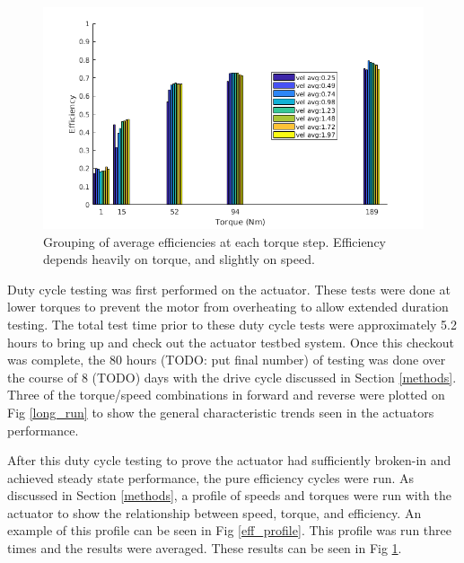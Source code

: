 
   \begin{figure}[t]
      \centering
      \includegraphics[width=\linewidth]{eff_test_bar_plot_v2}
      \caption{Grouping of average efficiencies at each torque step. Efficiency depends heavily on torque, and slightly on speed.}
      \label{eff_results}
   \end{figure}

Duty cycle testing was first performed on the actuator. These tests were done at lower torques to prevent the motor from overheating to allow extended duration testing. The total test time prior to these duty cycle tests were approximately 5.2 hours to bring up and check out the actuator testbed system. Once this checkout was complete, the 80 hours (TODO: put final number) of testing was done over the course of 8 (TODO) days with the drive cycle discussed in Section \ref{methods}. Three of the torque/speed combinations in forward and reverse were plotted on Fig \ref{long_run} to show the general characteristic trends seen in the actuators performance. 
   
After this duty cycle testing to prove the actuator had sufficiently broken-in and achieved steady state performance, the pure efficiency cycles were run. As discussed in Section \ref{methods}, a profile of speeds and torques were run with the actuator to show the relationship between speed, torque, and efficiency. An example of this profile can be seen in Fig \ref{eff_profile}. This profile was run three times and the results were averaged. These results can be seen in Fig \ref{eff_results}. 
